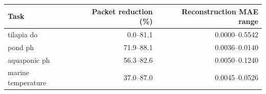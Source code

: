 \begin{tabular}{lrr}
\toprule
Task & Packet reduction (\%) & Reconstruction MAE range \\
\midrule
tilapia do & 0.0--81.1 & 0.0000--0.5542 \\
pond ph & 71.9--88.1 & 0.0036--0.0140 \\
aquaponic ph & 56.3--82.6 & 0.0050--0.1240 \\
marine temperature & 37.0--87.0 & 0.0045--0.0526 \\
\bottomrule
\end{tabular}